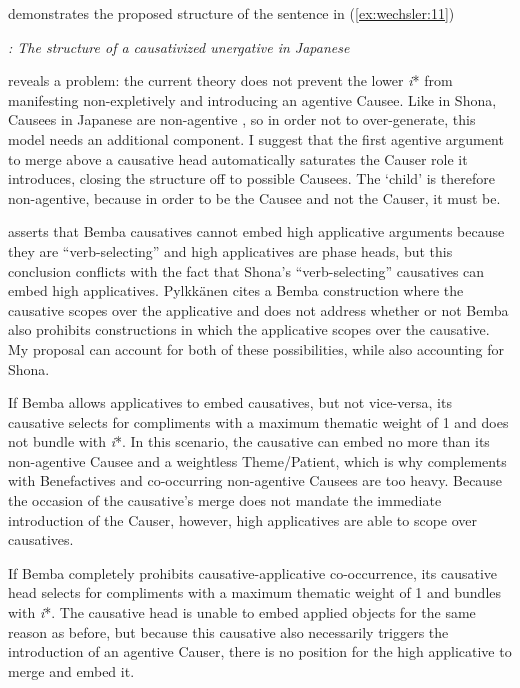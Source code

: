 \documentclass[output=paper]{langscibook}
\begin{document}
 demonstrates the proposed structure of the sentence in (\ref{ex:wechsler:11})



    
 



\textit{: The structure of a causativized unergative in Japanese}



 reveals a problem: the current theory does not prevent the lower \textit{i}* from manifesting non-expletively and introducing an agentive Causee. Like in Shona, Causees in Japanese are non-agentive \citep[107]{Pylkkänen2008}, so in order not to over-generate, this model needs an additional component. I suggest that the first agentive argument to merge above a causative head automatically saturates the Causer role it introduces, closing the structure off to possible Causees. The ‘child’ is therefore non-agentive, because in order to be the Causee and not the Causer, it must be. 



\citet{Pylkkänen2008} asserts that Bemba causatives cannot embed high applicative arguments because they are “verb-selecting” and high applicatives are phase heads, but this conclusion conflicts with the fact that Shona’s “verb-selecting” causatives can embed high applicatives. Pylkkänen cites a Bemba construction where the causative scopes over the applicative and does not address whether or not Bemba also prohibits constructions in which the applicative scopes over the causative. My proposal can account for both of these possibilities, while also accounting for Shona. 



If Bemba allows applicatives to embed causatives, but not vice-versa, its causative selects for compliments with a maximum thematic weight of 1 and does not bundle with \textit{i}*. In this scenario, the causative can embed no more than its non-agentive Causee and a weightless Theme/Patient, which is why complements with Benefactives and co-occurring non-agentive Causees are too heavy. Because the occasion of the causative’s merge does not mandate the immediate introduction of the Causer, however, high applicatives are able to scope over causatives. 



If Bemba completely prohibits causative-applicative co-occurrence, its causative head selects for compliments with a maximum thematic weight of 1 and bundles with \textit{i}*. The causative head is unable to embed applied objects for the same reason as before, but because this causative also necessarily triggers the introduction of an agentive Causer, there is no position for the high applicative to merge and embed it. 
\end{document}

